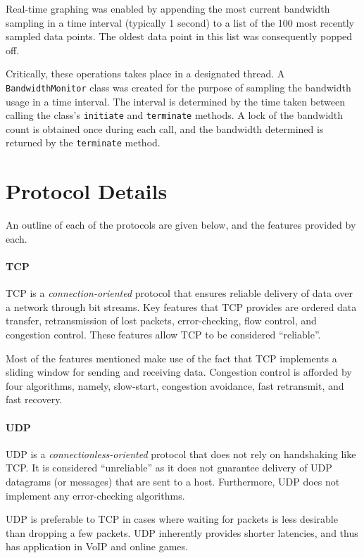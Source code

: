 \documentclass[10pt,a4paper]{article}
\begin{document}
Real-time graphing was enabled by appending the most current bandwidth sampling in a time interval (typically 1 second)
to a list of the 100 most recently sampled data points. The oldest data point in this list was consequently popped off.

Critically, these operations takes place in a designated thread. A \texttt{BandwidthMonitor} class was created for the purpose
of sampling the bandwidth usage in a time interval. The interval is determined by the time taken between calling the class's 
\texttt{initiate} and \texttt{terminate} methods. A lock of the bandwidth count is obtained once during each call, and the
bandwidth determined is returned by the \texttt{terminate} method.

\section{Protocol Details}
An outline of each of the protocols are given below, and the features provided by each. 

\paragraph{TCP}
TCP is a \emph{connection-oriented} protocol that ensures reliable delivery of data over a network through bit streams. Key features
that TCP provides are ordered data transfer, retransmission of lost packets, error-checking, flow control, and congestion control. 
These features allow TCP to be considered ``reliable''. 

Most of the features mentioned make use of the fact that TCP implements a sliding
window for sending and receiving data. Congestion control is afforded by four algorithms, namely, slow-start, congestion avoidance,
fast retransmit, and fast recovery. 

\paragraph{UDP}
UDP is a \emph{connectionless-oriented} protocol that does not rely on handshaking like TCP. It is considered ``unreliable'' as it 
does not guarantee delivery of UDP datagrams (or messages) that are sent to a host. Furthermore, UDP does not implement
any error-checking algorithms.

UDP is preferable to TCP in cases where waiting for packets is less desirable than dropping a few packets. UDP inherently provides
shorter latencies, and thus has application in VoIP and online games. 
\end{document}
